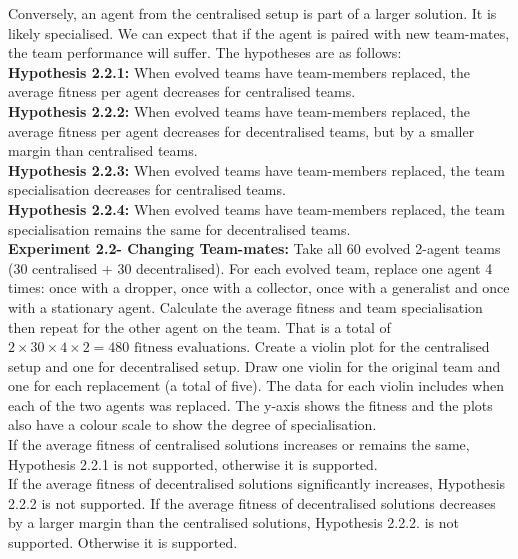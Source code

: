 \documentclass[12pt]{article}
\begin{document}
Conversely, an agent from the centralised setup is part of a larger solution. It is likely specialised. We can expect that if the agent is paired with new team-mates, the team performance will suffer. 
The hypotheses are as follows:\\

\textbf{Hypothesis 2.2.1:} When evolved teams have team-members replaced, the average fitness per agent decreases for centralised teams.\\

\textbf{Hypothesis 2.2.2:} When evolved teams have team-members replaced, the average fitness per agent decreases for decentralised teams, but by a smaller margin than centralised teams.\\

\textbf{Hypothesis 2.2.3:} When evolved teams have team-members replaced, the team specialisation decreases for centralised teams.\\

\textbf{Hypothesis 2.2.4:} When evolved teams have team-members replaced, the team specialisation remains the same for decentralised teams.\\

\textbf{Experiment 2.2- Changing Team-mates:} Take all 60 evolved 2-agent teams (30 centralised + 30 decentralised).
For each evolved team, replace one agent 4 times: once with a dropper, once with a collector, once with a generalist and once with a stationary agent.
Calculate the average fitness and team specialisation then repeat for the other agent on the team.
That is a total of $2 \times 30 \times 4 \times 2= 480 \mbox{ fitness evaluations}$. 
Create a violin plot for the centralised setup and one for decentralised setup.
Draw one violin for the original team and one for each replacement (a total of five).
The data for each violin includes when each of the two agents was replaced.
The y-axis shows the fitness and the plots also have a colour scale to show the degree of specialisation.\\

If the average fitness of centralised solutions increases or remains the same, Hypothesis 2.2.1 is not supported, otherwise it is supported.\\

If the average fitness of decentralised solutions significantly increases, Hypothesis 2.2.2 is not supported.
If the average fitness of decentralised solutions decreases by a larger margin than the centralised solutions, Hypothesis 2.2.2. is not supported.
Otherwise it is supported.\\
\end{document}
